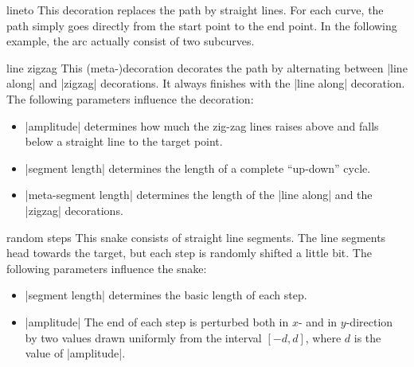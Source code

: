 \begin{decoration}{lineto}
  This decoration replaces the path by straight lines. For each curve,
  the path simply goes directly from the start point to the end point.
  In the following example, the arc actually consist of two
  subcurves. 
\begin{codeexample}[]
\end{codeexample}
\end{decoration}


\begin{decoration}{line zigzag}
  This (meta-)decoration decorates the path by alternating between 
  |line along| and |zigzag| decorations. It always finishes
  with the |line along| decoration. The following parameters influence
  the decoration:
  \begin{itemize}
  \item |amplitude|
    determines how much the zig-zag lines raises above and falls below
    a straight line to the target point.
  \item |segment length|
    determines the length of a complete ``up-down'' cycle.
  \item	|meta-segment length|
    determines the length of the |line along| and the |zigzag| decorations.
  \end{itemize}

\begin{codeexample}[]
\end{codeexample}
\end{decoration}


\begin{decoration}{random steps}
  This snake consists of straight line segments. The line segments
  head towards the target, but each step is randomly shifted a little
  bit. The following parameters influence the snake:
  \begin{itemize}
  \item |segment length|
    determines the basic length of each step.
  \item |amplitude|
    The end of each step is perturbed both in $x$- and in
    $y$-direction by two values drawn uniformly from the interval
    $[-d,d]$, where $d$ is the value of |amplitude|.
  \end{itemize}
\begin{codeexample}[]
\end{codeexample}
\end{decoration}


